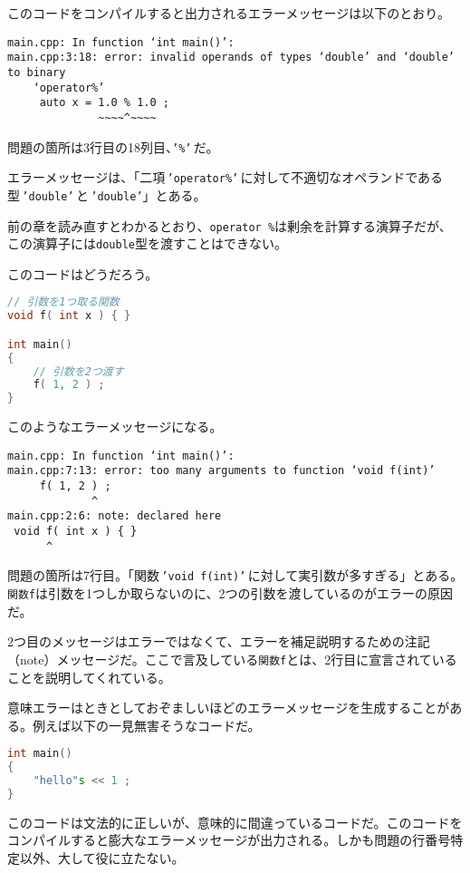 このコードをコンパイルすると出力されるエラーメッセージは以下のとおり。

\begin{lstlisting}[style=terminal]
main.cpp: In function ‘int main()’:
main.cpp:3:18: error: invalid operands of types ‘double’ and ‘double’ to binary
    ‘operator%’
     auto x = 1.0 % 1.0 ;
              ~~~~^~~~~
\end{lstlisting}

問題の箇所は3行目の18列目、\texttt{'\%'}\,だ。

エラーメッセージは、「二項\,\texttt{'operator\%'}\,に対して不適切なオペランドである型\,\texttt{'double'}\,と{\allowbreak}\,\texttt{'double'}」とある。

前の章を読み直すとわかるとおり、\texttt{operator \%}は剰余を計算する演算子だが、この演算子には\texttt{double}型を渡すことはできない。

このコードはどうだろう。

\begin{lstlisting}[language=c++]
// 引数を1つ取る関数
void f( int x ) { }

int main()
{
    // 引数を2つ渡す
    f( 1, 2 ) ;
}
\end{lstlisting}

このようなエラーメッセージになる。

\ifTombow\pagebreak\fi
\begin{lstlisting}[style=terminal]
main.cpp: In function ‘int main()’:
main.cpp:7:13: error: too many arguments to function ‘void f(int)’
     f( 1, 2 ) ;
             ^
main.cpp:2:6: note: declared here
 void f( int x ) { }
      ^
\end{lstlisting}

問題の箇所は7行目。「関数\,\texttt{'void f(int)'}\,に対して実引数が多すぎる」とある。\texttt{関数f}は引数を1つしか取らないのに、2つの引数を渡しているのがエラーの原因だ。

2つ目のメッセージはエラーではなくて、エラーを補足説明するための注記（note）メッセージだ。ここで言及している\texttt{関数f}とは、2行目に宣言されていることを説明してくれている。

意味エラーはときとしておぞましいほどのエラーメッセージを生成することがある。例えば以下の一見無害そうなコードだ。

\begin{lstlisting}[language=c++]
int main()
{
    "hello"s << 1 ;
}
\end{lstlisting}

このコードは文法的に正しいが、意味的に間違っているコードだ。このコードをコンパイルすると膨大なエラーメッセージが出力される。しかも問題の行番号特定以外、大して役に立たない。

